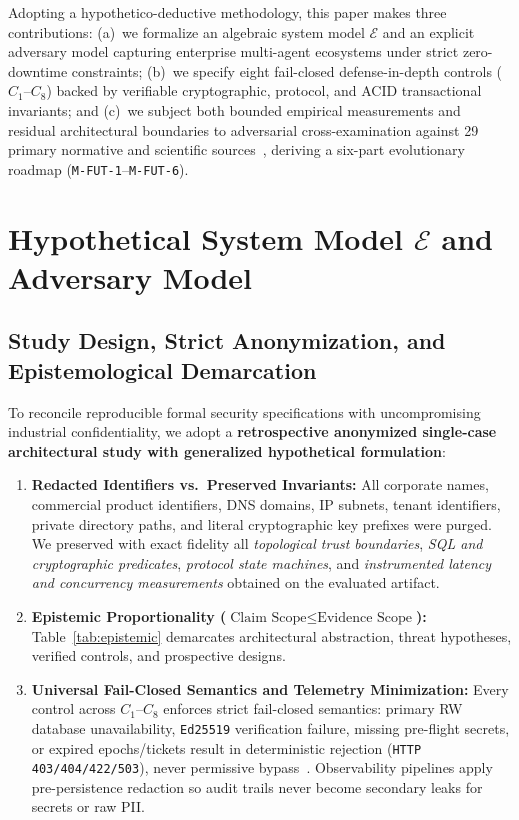 \documentclass[10pt,twocolumn]{article}
\begin{document}
Adopting a hypothetico-deductive methodology, this paper makes three contributions: (a)~we formalize an algebraic system model $\mathcal{E}$ and an explicit adversary model capturing enterprise multi-agent ecosystems under strict zero-downtime constraints; (b)~we specify eight fail-closed defense-in-depth controls ($C_1$--$C_8$) backed by verifiable cryptographic, protocol, and ACID transactional invariants; and (c)~we subject both bounded empirical measurements and residual architectural boundaries to adversarial cross-examination against 29 primary normative and scientific sources~\cite{R01,R02,R03,R04,R05,R06,R07,R08,R09,R10,R11,R12,R13,R14,R15,R16,R17,R18,R19,R20,R21,R22,R23,R24,R25,R26,R27,R28,R29}, deriving a six-part evolutionary roadmap (\texttt{M-FUT-1}--\texttt{M-FUT-6}).

\section{Hypothetical System Model $\mathcal{E}$ and Adversary Model}

\subsection{Study Design, Strict Anonymization, and Epistemological Demarcation}

To reconcile reproducible formal security specifications with uncompromising industrial confidentiality, we adopt a \textbf{retrospective anonymized single-case architectural study with generalized hypothetical formulation}:
\begin{enumerate}[leftmargin=1.4em,itemsep=2pt,topsep=3pt]
  \item \textbf{Redacted Identifiers vs.\ Preserved Invariants:} All corporate names, commercial product identifiers, DNS domains, IP subnets, tenant identifiers, private directory paths, and literal cryptographic key prefixes were purged. We preserved with exact fidelity all \emph{topological trust boundaries}, \emph{SQL and cryptographic predicates}, \emph{protocol state machines}, and \emph{instrumented latency and concurrency measurements} obtained on the evaluated artifact.
  \item \textbf{Epistemic Proportionality ($\text{Claim Scope} \le \text{Evidence Scope}$):} Table~\ref{tab:epistemic} demarcates architectural abstraction, threat hypotheses, verified controls, and prospective designs.
  \item \textbf{Universal Fail-Closed Semantics and Telemetry Minimization:} Every control across $C_1$--$C_8$ enforces strict fail-closed semantics: primary RW database unavailability, \texttt{Ed25519} verification failure, missing pre-flight secrets, or expired epochs/tickets result in deterministic rejection (\texttt{HTTP 403/404/422/503}), never permissive bypass~\cite{R01}. Observability pipelines apply pre-persistence redaction so audit trails never become secondary leaks for secrets or raw PII.
\end{enumerate}
\end{document}

